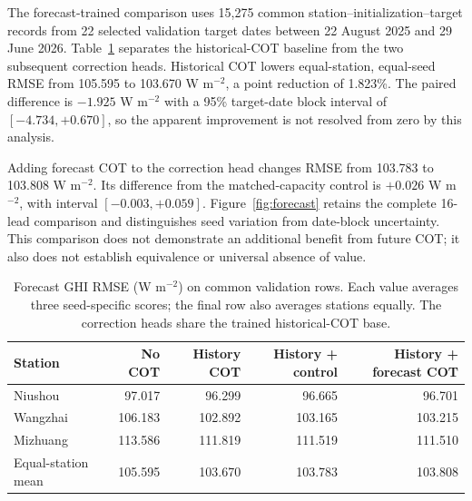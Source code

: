 \documentclass[11pt]{article}
\begin{document}
The forecast-trained comparison uses 15,275 common station--initialization--target records from 22 selected validation target dates between 22 August 2025 and 29 June 2026. Table~\ref{tab:forecast_values} separates the historical-COT baseline from the two subsequent correction heads. Historical COT lowers equal-station, equal-seed RMSE from 105.595 to 103.670 W m$^{-2}$, a point reduction of 1.823\%. The paired difference is $-1.925$ W m$^{-2}$ with a 95\% target-date block interval of $[-4.734,+0.670]$, so the apparent improvement is not resolved from zero by this analysis.

Adding forecast COT to the correction head changes RMSE from 103.783 to 103.808 W m$^{-2}$. Its difference from the matched-capacity control is $+0.026$ W m$^{-2}$, with interval $[-0.003,+0.059]$. Figure~\ref{fig:forecast} retains the complete 16-lead comparison and distinguishes seed variation from date-block uncertainty. This comparison does not demonstrate an additional benefit from future COT; it also does not establish equivalence or universal absence of value.

\begin{table}[!htbp]\centering\small
\caption{Forecast GHI RMSE (W m$^{-2}$) on common validation rows. Each value averages three seed-specific scores; the final row also averages stations equally. The correction heads share the trained historical-COT base.}\label{tab:forecast_values}
\begin{tabularx}{\linewidth}{Xrrrr}\toprule
Station & No COT & History COT & History + control & History + forecast COT\\\midrule
Niushou & 97.017 & 96.299 & 96.665 & 96.701\\
Wangzhai & 106.183 & 102.892 & 103.165 & 103.215\\
Mizhuang & 113.586 & 111.819 & 111.519 & 111.510\\
Equal-station mean & 105.595 & 103.670 & 103.783 & 103.808\\\bottomrule
\end{tabularx}\end{table}
\end{document}
